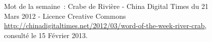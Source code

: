 \begin{figure}[h!]
    \centering
    



    \caption[Hexie]{ Mot de la semaine : Crabe de Rivière - China Digital Times du 21 Mars 2012 - Licence Creative Commons \url{http://chinadigitaltimes.net/2012/03/word-of-the-week-river-crab}, consulté le 15 Février 2013.}

\label{fig:hexie}
\end{figure}

